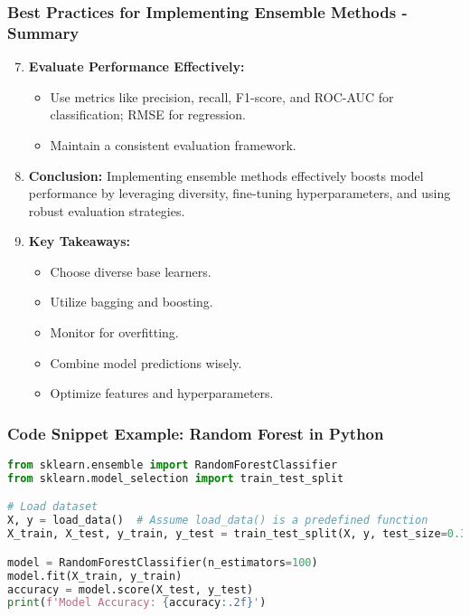 \documentclass[aspectratio=169]{beamer}
\begin{document}
\begin{frame}
    \frametitle{Best Practices for Implementing Ensemble Methods - Summary}
    \begin{enumerate}
        \setcounter{enumi}{6}
        \item \textbf{Evaluate Performance Effectively:}
            \begin{itemize}
                \item Use metrics like precision, recall, F1-score, and ROC-AUC for classification; RMSE for regression.
                \item Maintain a consistent evaluation framework.
            \end{itemize}
        
        \item \textbf{Conclusion:}
            Implementing ensemble methods effectively boosts model performance by leveraging diversity, fine-tuning hyperparameters, and using robust evaluation strategies.
        
        \item \textbf{Key Takeaways:}
            \begin{itemize}
                \item Choose diverse base learners.
                \item Utilize bagging and boosting.
                \item Monitor for overfitting.
                \item Combine model predictions wisely.
                \item Optimize features and hyperparameters.
            \end{itemize}
    \end{enumerate}
\end{frame}

\begin{frame}[fragile]
    \frametitle{Code Snippet Example: Random Forest in Python}
    \begin{lstlisting}[language=Python]
from sklearn.ensemble import RandomForestClassifier
from sklearn.model_selection import train_test_split

# Load dataset
X, y = load_data()  # Assume load_data() is a predefined function
X_train, X_test, y_train, y_test = train_test_split(X, y, test_size=0.3)

model = RandomForestClassifier(n_estimators=100)
model.fit(X_train, y_train)
accuracy = model.score(X_test, y_test)
print(f'Model Accuracy: {accuracy:.2f}')
    \end{lstlisting}
\end{frame}
\end{document}

